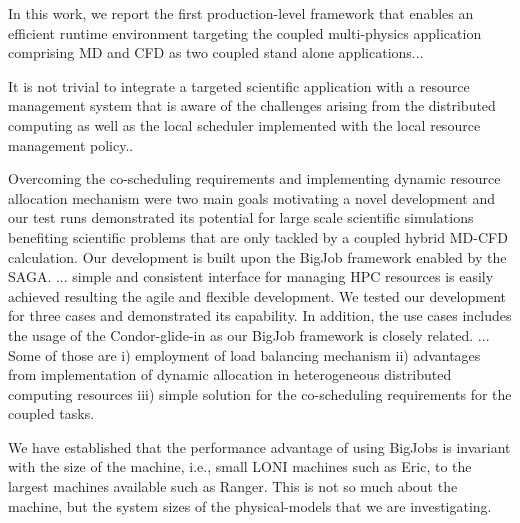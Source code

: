 \documentclass[conference,final]{IEEEtran}
\newcommand{\jhanote}[1]{ {\textcolor{red} { ***Jha: #1 }}}
\newcommand{\jhanote}[1]{}
\begin{document}
In this work, we report the first production-level framework that
enables an efficient runtime environment targeting the coupled
multi-physics application comprising MD and CFD as two coupled stand
alone applications...

It is not trivial to integrate a targeted scientific application with
a resource management system that is aware of the challenges arising
from the distributed computing as well as the local scheduler
implemented with the local resource management policy..

Overcoming the co-scheduling requirements and implementing dynamic
resource allocation mechanism were two main goals motivating a novel
development and our test runs demonstrated its potential for large
scale scientific simulations benefiting scientific problems that are
only tackled by a coupled hybrid MD-CFD calculation.  Our development
is built upon the BigJob framework enabled by the SAGA. ... simple and
consistent interface for managing HPC resources is easily achieved
resulting the agile and flexible development. We tested our
development for three cases and demonstrated its capability. In
addition, the use cases includes the usage of the Condor-glide-in as
our BigJob framework is closely related. ... Some of those are i)
employment of load balancing mechanism ii) advantages from
implementation of dynamic allocation in heterogeneous distributed
computing resources iii) simple solution for the co-scheduling
requirements for the coupled tasks.

We have established that the performance advantage of using BigJobs is
invariant with the size of the machine, i.e., small LONI machines such
as Eric, to the largest machines available such as Ranger. This is not
so much about the machine, but the system sizes of the physical-models
that we are investigating.

\end{document}
